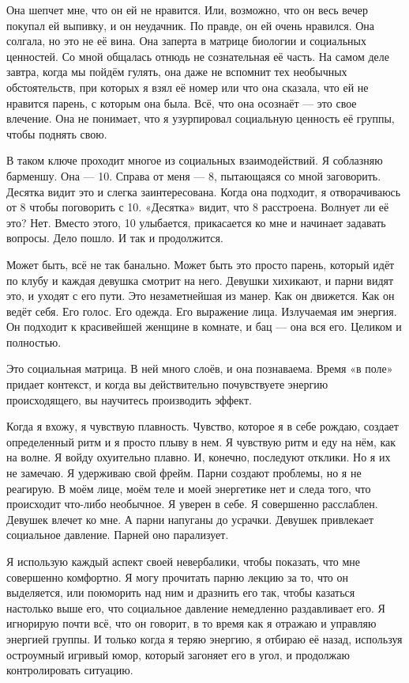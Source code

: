 Она шепчет мне, что он ей не нравится. Или, возможно, что он весь вечер покупал ей выпивку, и он неудачник. По правде, он ей очень нравился. Она солгала, но это не её вина. Она заперта в матрице биологии и социальных ценностей. Со мной общалась отнюдь не сознательная её часть. На самом деле завтра, когда мы пойдём гулять, она даже не вспомнит тех необычных обстоятельств, при которых я взял её номер или что она сказала, что ей не нравится парень, с которым она была. Всё, что она осознаёт --- это свое влечение. Она не понимает, что я узурпировал социальную ценность её группы, чтобы поднять свою.

В таком ключе проходит многое из социальных взаимодействий. Я соблазняю барменшу. Она --- 10. Справа от меня --- 8, пытающаяся со мной заговорить. Десятка видит это и слегка заинтересована. Когда она подходит, я отворачиваюсь от 8 чтобы поговорить с 10. «Десятка» видит, что 8 расстроена. Волнует ли её это? Нет. Вместо этого, 10 улыбается, прикасается ко мне и начинает задавать вопросы. Дело пошло. И так и продолжится.

Может быть, всё не так банально. Может быть это просто парень, который идёт по клубу и каждая девушка смотрит на него. Девушки хихикают, и парни видят это, и уходят с его пути. Это незаметнейшая из манер. Как он движется. Как он ведёт себя. Его голос. Его одежда. Его выражение лица. Излучаемая им энергия. Он подходит к красивейшей женщине в комнате, и бац --- она вся его. Целиком и полностью.

Это социальная матрица. В ней много слоёв, и она познаваема. Время «в поле» придает контекст, и когда вы действительно почувствуете энергию происходящего, вы научитесь производить эффект.

Когда я вхожу, я чувствую плавность. Чувство, которое я в себе рождаю, создает определенный ритм и я просто плыву в нем. Я чувствую ритм и еду на нём, как на волне. Я войду охуительно плавно. И, конечно, последуют отклики. Но я их не замечаю. Я удерживаю свой фрейм. Парни создают проблемы, но я не реагирую. В моём лице, моём теле и моей энергетике нет и следа того, что происходит что-либо необычное. Я уверен в себе. Я совершенно расслаблен. Девушек влечет ко мне. А парни напуганы до усрачки. Девушек привлекает социальное давление. Парней оно парализует.

Я использую каждый аспект своей невербалики, чтобы показать, что мне совершенно комфортно. Я могу прочитать парню лекцию за то, что он выделяется, или поюморить над ним и дразнить его так, чтобы казаться настолько выше его, что социальное давление немедленно раздавливает его. Я игнорирую почти всё, что он говорит, в то время как я отражаю и управляю энергией группы. И только когда я теряю энергию, я отбираю её назад, используя остроумный игривый юмор, который загоняет его в угол, и продолжаю контролировать ситуацию.

